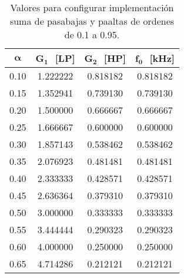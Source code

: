 	\begin{table}[!hbp]                                      
		\centering   
		\caption{Valores para configurar implementación suma de pasabajas y paaltas de ordenes de 0.1 a 0.95.}                            
		\label{tab:calculos_bilineal_suma}                                        
			\begin{tabular}{cccc}                        
			\hline                                              
			$\bm{\alpha}$ & $\bm{G_{1}}\,\,$ [LP] & $\bm{G_{2}}\,\,$ [HP] & $\bm{f_{0}}\,\,$ [kHz]  \\            
			\hline                                              
			0.10 & 1.222222 & 0.818182 & 0.818182 \\ 
			                                 
			0.15 & 1.352941 & 0.739130 & 0.739130 \\ 
			                                 
			0.20 & 1.500000 & 0.666667 & 0.666667 \\ 
			                                
			0.25 & 1.666667 & 0.600000 & 0.600000 \\ 
			                                  
			0.30 & 1.857143 & 0.538462 & 0.538462 \\ 
			                                  
			0.35 & 2.076923 & 0.481481 & 0.481481 \\ 
			                                  
			0.40 & 2.333333 & 0.428571 & 0.428571 \\ 
			                               
			0.45 & 2.636364 & 0.379310 & 0.379310 \\ 
			                                 
			0.50 & 3.000000 & 0.333333 & 0.333333 \\ 
			                                   
			0.55 & 3.444444 & 0.290323 & 0.290323 \\ 
			                                  
			0.60 & 4.000000 & 0.250000 & 0.250000 \\ 
			                                 
			0.65 & 4.714286 & 0.212121 & 0.212121 \\ 
			                                   

\end{tabular}
\end{table}
